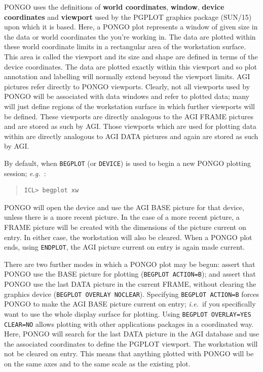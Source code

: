 \documentclass[twoside,11pt]{article}
\newcommand{\htmlref}[2]{#1}
\newcommand{\xref}[3]{#1}
\renewcommand{\_}{\texttt{\symbol{95}}}
\newcommand{\eg}{{\em e.g.\ }}
\newcommand{\ie}{{\em i.e.\ }}
\newcommand{\cnam}[1]{{\tt #1}}
\newcommand{\iref} [1]{\htmlref{#1}{#1}}
\begin{document}
PONGO uses the definitions of {\bf world coordinates}, {\bf window},
{\bf device coordinates} and {\bf viewport} used by the
\xref{PGPLOT graphics package (SUN/15)}{sun15}{} upon which it is based.
Here, a PONGO plot represents a window of given size in the data or world
coordinates the you're working in.
The data are plotted within these world coordinate limits in a rectangular
area of the workstation surface.
This area is called the viewport and its size and shape are defined in terms of
the device coordinates.
The data are plotted exactly within this viewport and so plot annotation and
labelling will normally extend beyond the viewport limits.
AGI pictures refer directly to PONGO viewports.
Clearly, not all viewports used by PONGO will be associated with data windows
and refer to plotted data; many will just define regions of the workstation
surface in which further viewports will be defined.
These viewports are directly analogous to the AGI FRAME pictures and are
stored as such by AGI.
Those viewports which are used for plotting data within are directly analogous
to AGI DATA pictures and again are stored as such by AGI.

By default, when \cnam{\iref{BEGPLOT}} (or \cnam{\iref{DEVICE}}) is used to
begin a new PONGO plotting session; \eg:
\begin{quote}
\begin{verbatim}
ICL> begplot xw
\end{verbatim}
\end{quote}
PONGO will open the device and use the AGI BASE picture for that device, unless
there is a more recent picture.
In the case of a more recent picture, a FRAME picture will be created with the
dimensions of the picture current on entry.
In either case, the workstation will also be cleared.
When a PONGO plot ends, using \cnam{\iref{ENDPLOT}}, the AGI picture current on entry
is again made current.

There are two further modes in which a PONGO plot may be begun: assert
that PONGO use the BASE picture for plotting (\cnam{\iref{BEGPLOT} ACTION=B});
and assert that PONGO use the last DATA picture in the
current FRAME, without clearing the graphics device (\cnam{\iref{BEGPLOT}
OVERLAY NOCLEAR}).  Specifying \cnam{\iref{BEGPLOT} ACTION=B} forces PONGO to
make the AGI BASE picture current on entry; \ie if you specifically
want to use the whole display surface for plotting.
Using \cnam{\iref{BEGPLOT} OVERLAY=YES CLEAR=NO} allows plotting with other
applications packages in a coordinated way.  Here, PONGO will search
for the last DATA picture in the AGI database and use the associated
coordinates to define the PGPLOT viewport.  The workstation will not
be cleared on entry.  This means that anything plotted with PONGO will
be on the same axes and to the same scale as the existing plot.
\end{document}
